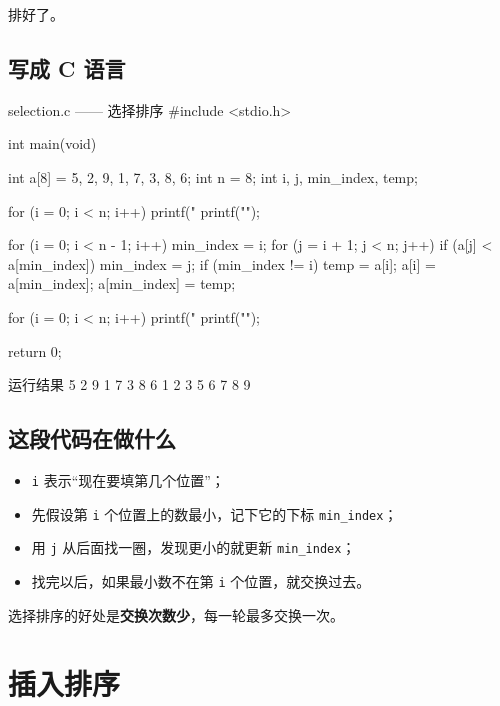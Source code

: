排好了。

\subsection{写成 C 语言}

\begin{codebox}{selection.c —— 选择排序}
#include <stdio.h>

int main(void)
{
    int a[8] = {5, 2, 9, 1, 7, 3, 8, 6};
    int n = 8;
    int i, j, min_index, temp;

    for (i = 0; i < n; i++) {
        printf("%
    }
    printf("\n");

    for (i = 0; i < n - 1; i++) {
        min_index = i;
        for (j = i + 1; j < n; j++) {
            if (a[j] < a[min_index]) {
                min_index = j;
            }
        }
        if (min_index != i) {
            temp = a[i];
            a[i] = a[min_index];
            a[min_index] = temp;
        }
    }

    for (i = 0; i < n; i++) {
        printf("%
    }
    printf("\n");

    return 0;
}
\end{codebox}

\begin{outbox}{运行结果}
5 2 9 1 7 3 8 6
1 2 3 5 6 7 8 9
\end{outbox}

\subsection{这段代码在做什么}

\begin{itemize}
  \item \texttt{i} 表示“现在要填第几个位置”；
  \item 先假设第 \texttt{i} 个位置上的数最小，记下它的下标 \texttt{min\_index}；
  \item 用 \texttt{j} 从后面找一圈，发现更小的就更新 \texttt{min\_index}；
  \item 找完以后，如果最小数不在第 \texttt{i} 个位置，就交换过去。
\end{itemize}

选择排序的好处是\textbf{交换次数少}，每一轮最多交换一次。

\section{插入排序}

